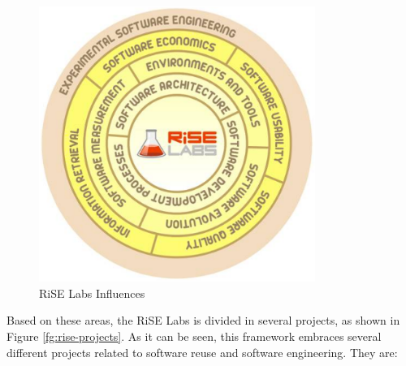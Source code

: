 \begin{figure}[htp]
\begin{center}
  \includegraphics[width=9cm]{chapters/introduction/rise-spiral.png}
  \caption[RiSE Labs Influences]{RiSE Labs Influences}
  \label{fg:rise-spiral}
\end{center}
\end{figure}

Based on these areas, the RiSE Labs is divided in several projects, as shown in
Figure \ref{fg:rise-projects}. As it can be seen, this framework embraces
several different projects related to software reuse and software engineering.
They are:

